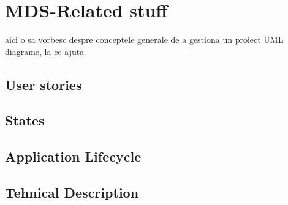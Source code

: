 \section{MDS-Related stuff}
	aici o sa vorbesc despre conceptele generale de a gestiona un proiect
	UML
	diagrame, la ce ajuta
	\subsection{User stories}
	\subsection{States}
	\subsection{Application Lifecycle}
	\subsection{Tehnical Description}
